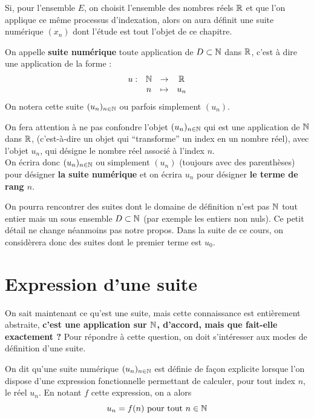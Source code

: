\documentclass[a4paper, 12pt]{report}
\begin{document}
Si, pour l'ensemble $E$, on choisit l'ensemble des nombres réels $\mathbb{R}$ et que l'on applique ce même processus d'indexation, alors on aura définit une suite numérique $(x_n)$ dont l'étude est tout l'objet de ce chapitre.

\begin{defn}
On appelle \textbf{suite numérique} toute application de $D \subset \mathbb{N}$ dans $\mathbb{R}$, c'est à dire une application de la forme :
\[ \begin{array}{c c c c}
u : & \mathbb{N} & \to & \mathbb{R} \\
& n & \mapsto & u_n
\end{array} \]
On notera cette suite $(u_n)_{n \in \mathbb{N}}$ ou parfois simplement $(u_n)$.
\end{defn}

\begin{nota}
On fera attention à ne pas confondre l'objet $(u_n)_{n \in \mathbb{N}}$ qui est une application de $\mathbb{N}$ dans $\mathbb{R}$, (c'est-à-dire un objet qui ``transforme'' un index en un nombre réel), avec l'objet $u_n$, qui désigne le nombre réel associé à l'index $n$. \\
On écrira donc $(u_n)_{n \in \mathbb{N}}$ ou simplement $(u_n)$ (toujours avec des parenthèses) pour désigner \textbf{la suite numérique} et on écrira $u_n$ pour désigner \textbf{le terme de rang $n$}.
\end{nota} 

\begin{rmq}
On pourra rencontrer des suites dont le domaine de définition n'est pas $\mathbb{N}$ tout entier mais un sous ensemble $D \subset \mathbb{N}$ (par exemple les entiers non nuls). Ce petit détail ne change néanmoins pas notre propos.
Dans la suite de ce cours, on considèrera donc des suites dont le premier terme est $u_0$.
\end{rmq}

\section{Expression d'une suite}

On sait maintenant ce qu'est une suite, mais cette connaissance est entièrement abstraite, \textbf{c'est une application sur $\mathbb{N}$, d'accord, mais que fait-elle exactement ?} Pour répondre à cette question, on doit s'intéresser aux modes de définition d'une suite.

\begin{defn}
On dit qu'une suite numérique $(u_n)_{n \in \mathbb{N}}$ est définie de façon explicite lorsque l'on dispose d'une expression fonctionnelle permettant de calculer, pour tout index $n$, le réel $u_n$. En notant $f$ cette expression, on a alors 
\[ u_n = f(n) \text{ pour tout } n \in \mathbb{N} \]
\end{defn}
\end{document}
